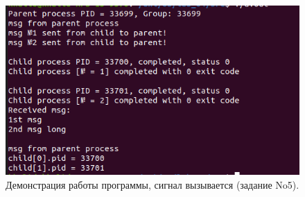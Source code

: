 \documentclass[12pt]{report}
\begin{document}
\begin{figure}[H]

	\centering

	\includegraphics[width=\linewidth]{img/task05_02.png}
	\caption{Демонстрация работы программы, сигнал вызывается (задание No5).}

	\label{fig:task05_02}

\end{figure}



\end{document}
